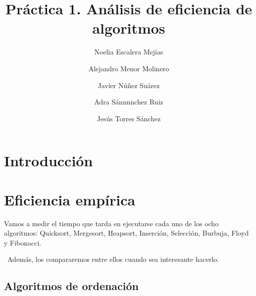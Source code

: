 \documentclass{article}
\title{Práctica 1. Análisis de eficiencia de algoritmos}
\author{Noelia Escalera Mejías \\
		\and Alejandro Menor Molinero \\
		\and Javier Núñez Suárez \\
		\and Adra Sánnnnchez Ruiz \\
		\and Jesús Torres Sánchez}
\begin{document}
	\maketitle
	\section{Introducción}
	\section{Eficiencia empírica}
	Vamos a medir el tiempo que tarda en ejecutarse cada uno de los ocho algoritmos: Quicksort, Mergesort, Heapsort, Inserción, Selección, Burbuja, Floyd y Fibonacci.
	
	\
	Además, los compararemos entre ellos cuando sea interesante hacerlo.
	\subsection{Algoritmos de ordenación}
\end{document}
